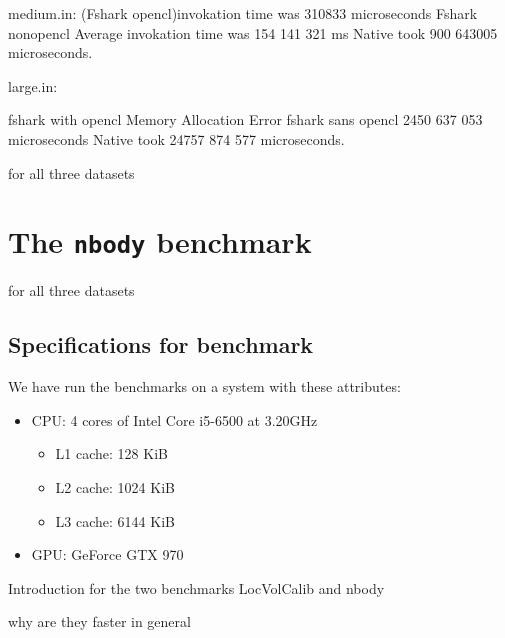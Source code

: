 medium.in:
(Fshark opencl)invokation time was 310833 microseconds
Fshark nonopencl Average invokation time was 154 141 321 ms
Native took 900 643005 microseconds.

large.in:

fshark with opencl Memory Allocation Error
fshark sans opencl 2450 637 053 microseconds
Native took 24757 874 577 microseconds.


for all three datasets



\section*{The \texttt{nbody} benchmark}

for all three datasets


\subsection*{Specifications for benchmark}
We have run the benchmarks on a system with these attributes:
\begin{itemize}
\item CPU: 4 cores of Intel Core i5-6500 at 3.20GHz
  \begin{itemize}
  \item L1 cache: 128 KiB 
  \item L2 cache: 1024 KiB 
  \item L3 cache: 6144 KiB 
  \end{itemize}
\item GPU: GeForce GTX 970
\end{itemize}


Introduction for the two benchmarks LocVolCalib and nbody



why are they faster in general



